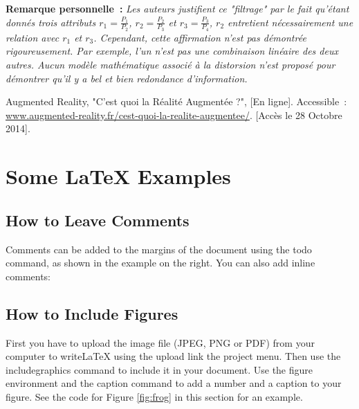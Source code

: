 \documentclass[a4paper]{article}
\begin{document}
\textbf{Remarque personnelle~:} \textit{Les auteurs justifient ce "filtrage" par le fait qu'étant donnés trois attributs $r_1 = \frac{P_1}{P_2}$, $r_2 = \frac{P_2}{P_3}$ et $r_3 = \frac{P_3}{P_4}$, $r_2$ entretient nécessairement une relation avec $r_1$ et $r_3$. Cependant, cette affirmation n'est pas démontrée rigoureusement. Par exemple, l'un n'est pas une combinaison linéaire des deux autres. Aucun modèle mathématique associé à la distorsion n'est proposé pour démontrer qu'il y a bel et bien redondance d'information.}

\begin{thebibliography}{1}
	 Augmented Reality, "C'est quoi la Réalité Augmentée ?", [En ligne]. Accessible~: \url{www.augmented-reality.fr/cest-quoi-la-realite-augmentee/}. [Accès le 28 Octobre 2014].
\end{thebibliography}

\newpage

\section{Some \LaTeX{} Examples}
\label{sec:examples}

\subsection{How to Leave Comments}

Comments can be added to the margins of the document using the  todo command, as shown in the example on the right. You can also add inline comments:


\subsection{How to Include Figures}

First you have to upload the image file (JPEG, PNG or PDF) from your computer to writeLaTeX using the upload link the project menu. Then use the includegraphics command to include it in your document. Use the figure environment and the caption command to add a number and a caption to your figure. See the code for Figure \ref{fig:frog} in this section for an example.

\end{document}
